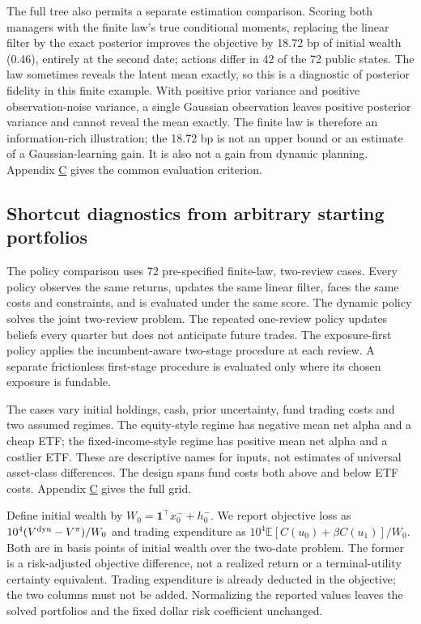 \documentclass[11pt]{article}
\begin{document}
The full tree also permits a separate estimation comparison. Scoring both managers with the finite law's true conditional moments, replacing the linear filter by the exact posterior improves the objective by 18.72 bp of initial wealth (0.46), entirely at the second date; actions differ in 42 of the 72 public states. The law sometimes reveals the latent mean exactly, so this is a diagnostic of posterior fidelity in this finite example. With positive prior variance and positive observation-noise variance, a single Gaussian observation leaves positive posterior variance and cannot reveal the mean exactly. The finite law is therefore an information-rich illustration; the 18.72 bp is not an upper bound or an estimate of a Gaussian-learning gain. It is also not a gain from dynamic planning. Appendix \hyperref[sec:C]{C} gives the common evaluation criterion.

\subsection{Shortcut diagnostics from arbitrary starting portfolios}\label{sec:E.2}

The policy comparison uses 72 pre-specified finite-law, two-review cases. Every policy observes the same returns, updates the same linear filter, faces the same costs and constraints, and is evaluated under the same score. The dynamic policy solves the joint two-review problem. The repeated one-review policy updates beliefs every quarter but does not anticipate future trades. The exposure-first policy applies the incumbent-aware two-stage procedure at each review. A separate frictionless first-stage procedure is evaluated only where its chosen exposure is fundable.

The cases vary initial holdings, cash, prior uncertainty, fund trading costs and two assumed regimes. The equity-style regime has negative mean net alpha and a cheap ETF; the fixed-income-style regime has positive mean net alpha and a costlier ETF. These are descriptive names for inputs, not estimates of universal asset-class differences. The design spans fund costs both above and below ETF costs. Appendix \hyperref[sec:C]{C} gives the full grid.

Define initial wealth by \(W_0=\mathbf1^\top x^-_0+h^-_0\). We report objective loss as \(10^4(V^{\rm dyn}-V^\pi)/W_0\) and trading expenditure as \(10^4\mathbb E[C(u_0)+\beta C(u_1)]/W_0\). Both are in basis points of initial wealth over the two-date problem. The former is a risk-adjusted objective difference, not a realized return or a terminal-utility certainty equivalent. Trading expenditure is already deducted in the objective; the two columns must not be added. Normalizing the reported values leaves the solved portfolios and the fixed dollar risk coefficient unchanged.
\end{document}
